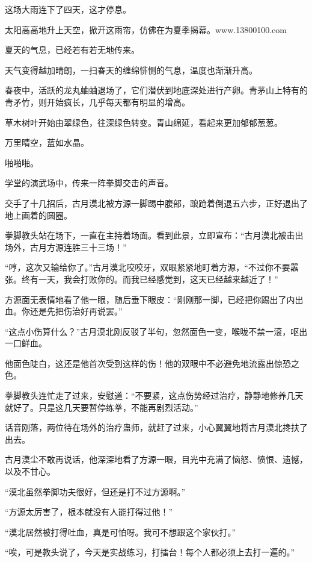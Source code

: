 
\begin{this_body}

这场大雨连下了四天，这才停息。

太阳高高地升上天空，掀开这雨帘，仿佛在为夏季揭幕。www.13800100.com

夏天的气息，已经若有若无地传来。

天气变得越加晴朗，一扫春天的缠绵悱恻的气息，温度也渐渐升高。

春夜中，活跃的龙丸蛐蛐退场了，它们潜伏到地底深处进行产卵。青茅山上特有的青矛竹，则开始疯长，几乎每天都有明显的增高。

草木树叶开始由翠绿色，往深绿色转变。青山绵延，看起来更加郁郁葱葱。

万里晴空，蓝如水晶。

啪啪啪。

学堂的演武场中，传来一阵拳脚交击的声音。

交手了十几招后，古月漠北被方源一脚踢中腹部，踉跄着倒退五六步，正好退出了地上画着的圆圈。

拳脚教头站在场下，一直在主持着场面。看到此景，立即宣布：“古月漠北被击出场外，古月方源连胜三十三场！”

“哼，这次又输给你了。”古月漠北咬咬牙，双眼紧紧地盯着方源，“不过你不要嚣张。终有一天，我会打败你的。而我已经感觉到，这天已经越来越近了！”

方源面无表情地看了他一眼，随后垂下眼皮：“刚刚那一脚，已经把你踢出了内出血。你还是先把伤治好再说罢。”

“这点小伤算什么？”古月漠北刚反驳了半句，忽然面色一变，喉咙不禁一滚，呕出一口鲜血。

他面色陡白，这还是他首次受到这样的伤！他的双眼中不必避免地流露出惊恐之色。

拳脚教头连忙走了过来，安慰道：“不要紧，这点伤势经过治疗，静静地修养几天就好了。只是这几天要暂停练拳，不能再剧烈活动。”

话音刚落，两位待在场外的治疗蛊师，就赶了过来，小心翼翼地将古月漠北搀扶了出去。

古月漠尘不敢再说话，他深深地看了方源一眼，目光中充满了恼怒、愤恨、遗憾，以及不甘心。

“漠北虽然拳脚功夫很好，但还是打不过方源啊。”

“方源太厉害了，根本就没有人能打得过他！”

“漠北居然被打得吐血，真是可怕呀。我可不想跟这个家伙打。”

“唉，可是教头说了，今天是实战练习，打擂台！每个人都必须上去打一遍的。”


\end{this_body}
